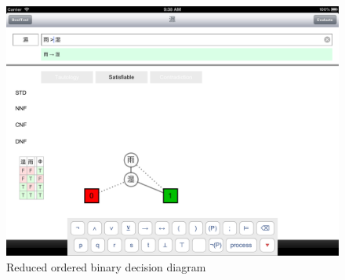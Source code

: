 \begin{figure}[htbp]
\begin{center}
\includegraphics[scale=0.25,trim=16.5cm 11.4cm 34.5cm 31.8cm, clip=true]{concept/RainHD.png}
\caption{Reduced ordered binary decision diagram}
\label{fig:BoolToolROBDD}
\end{center}
\end{figure}




